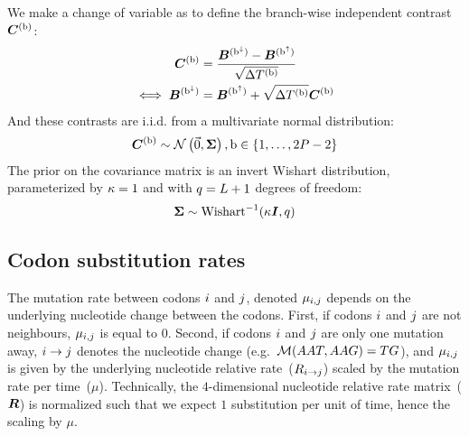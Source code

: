 We make a change of variable as to define the branch-wise independent contrast $\bm{C}^{(\text{b})}$:
\begin{align}
    \contrast\branchexp &= \dfrac{\Brownian^{(\nodeDown)} - \Brownian^{(\nodeUp)}}{\sqrt{\branchtime\branchexp}} \\
    \label{eq:independent_contrast}
    \iff \Brownian^{(\nodeDown)} &= \Brownian^{(\nodeUp)} + \sqrt{\branchtime\branchexp}\contrast\branchexp
\end{align}
And these contrasts are i.i.d.
from a multivariate normal distribution:
\begin{equation}
    \label{eq:Distribcontrast}
    \contrast\branchexp \sim \mathcal{N}\left(\vecZero, \CovarianceMatrix \right), \Setbranch
\end{equation}
The \gls{prior} on the covariance matrix is an invert Wishart distribution, parameterized by $\kappa=1$ and with $q=L + 1$ degrees of freedom:
\begin{equation}
    \label{eq:Distribcovariance}
    \CovarianceMatrix \sim \text{Wishart}^{-1} (\covariancekappa \Identitymatrix, \covariancedf)
\end{equation}

\subsection{Codon substitution rates}

The mutation rate between \glspl{codon} ${i}$ and ${j}$, denoted $\mu_{{i}, {j}}$ depends on the underlying nucleotide change between the \glspl{codon}.
First, if \glspl{codon} ${i}$ and ${j}$ are not neighbours, $\mu_{{i}, {j}}$ is equal to $0$.
Second, if \glspl{codon} ${i}$ and ${j}$ are only one mutation away, ${i} \rightarrow {j}$ denotes the nucleotide change (e.g.~$\mathcal{M}(AAT, AAG) = TG$), and $\mu_{{i}, {j}}$ is given by the underlying nucleotide relative rate~(${R_{{i} \rightarrow {j}}}$) scaled by the mutation rate per time~($\mu$).
Technically, the $4$-dimensional nucleotide relative rate matrix~($\bm{R}$) is normalized such that we expect $1$ \gls{substitution} per unit of time, hence the scaling by $\mu$.

